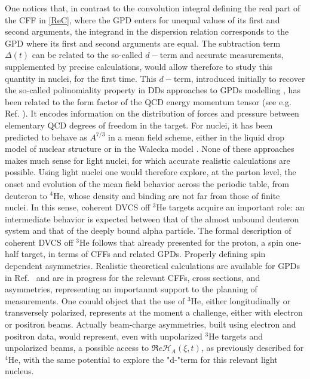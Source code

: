 \documentclass[times, twoside]{PosWhiPap}
\begin{document}
One notices that, in contrast to the convolution integral defining the real 
part of the CFF in \eqref{ReC}, where the GPD enters for unequal values of its 
first and second arguments, the integrand in the dispersion relation
corresponds to the GPD where its first and second arguments are equal.
The subtraction term $\Delta(t)$ can be related to the so-called $d-$term and
accurate measurements, supplemented by precise calculations, would allow 
therefore to study this quantity in nuclei, for the first time. This $d-$term, 
introduced initially to recover the so-called polinomiality property in DDs 
approaches to GPDs modelling \cite{Polyakov:1999gs}, has been related to the 
form factor of the QCD energy momentum tensor (see e.g. Ref.  
\cite{Polyakov:2018zvc}). It encodes information on the distribution of forces 
and pressure between elementary QCD degrees of freedom in the target. For
nuclei, it has been predicted to behave as $A^{7/3}$ in a mean field scheme, 
either in the liquid drop model of nuclear structure \cite{Polyakov:2002yz}
or in the Walecka model \cite{Jung:2014jja}. None of these approaches makes 
much sense for light nuclei, for which accurate realistic calculations are possible. 
Using light nuclei one would therefore explore, at the parton 
level, the onset and evolution of the mean field behavior across the
periodic table, from deuteron to $^4$He, whose density and binding are not far
from those of finite nuclei.
\vskip 0.2cm
In this sense, coherent DVCS off $^3$He targets acquire an important role: an intermediate 
behavior is expected between that of the almost unbound deuteron system and 
that of the deeply bound alpha particle. The formal description of coherent DVCS
off $^3$He follows that already presented for the proton, a spin one-half target, in terms of CFFs
and related GPDs. Properly defining spin dependent asymmetries. Realistic 
theoretical calculations are available for GPDs in 
Ref.~\cite{Scopetta:2004kj,Scopetta:2009sn,Rinaldi:2012ft,Rinaldi:2012pj} and 
are in progress for the relevant CFFs, cross sections, and asymmetries, 
representing an importanmt support to the planning of measurements.
{One couuld object that the use of $^3$He, either longitudinally or 
transversely polarized, represents at the moment a challenge, either with 
electron or positron beams. Actually beam-charge asymmetries, built using
electron and positron data, would represent, even with unpolarized $^3$He 
targets and unpolarized beams, a possible access to $\Re e 
\mathcal{H}_{A}(\xi,t)$, as previously described for $^4$He, with the same 
potential to explore the "d-"term for this relevant light nucleus.}
\end{document}
